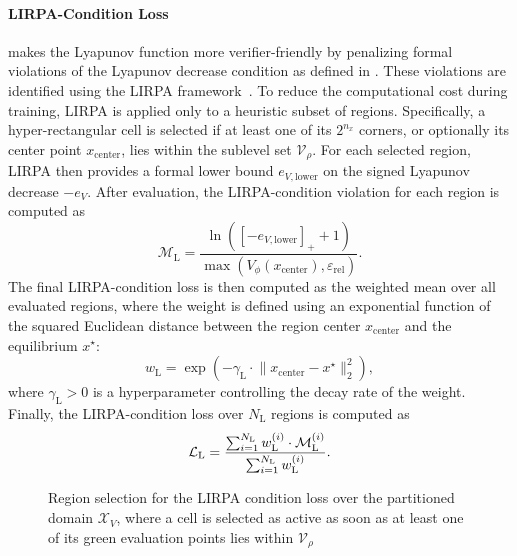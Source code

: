 \paragraph{LIRPA-Condition Loss} makes the Lyapunov function more verifier-friendly 
by penalizing formal violations of the Lyapunov decrease condition as defined in . 
These violations are identified using the LIRPA framework~\cite{xuFastCompleteEnabling2021}.
To reduce the computational cost during training, LIRPA is applied only to a 
heuristic subset of regions. Specifically, a hyper-rectangular cell is selected 
if at least one of its $2^{n_x}$ corners, or optionally its center point $x_{\mathrm{center}}$, 
lies within the sublevel set $\mathcal{V}_\rho$.
For each selected region, LIRPA then provides a formal lower bound $e_{V,\mathrm{lower}}$ on the 
signed Lyapunov decrease $-e_V$. 
After evaluation, the LIRPA-condition violation for each region is computed as
\begin{equation}
    \label{eq:relative-lirpa-condition}
    \mathcal{M}_{\mathrm{L}} = \frac{
        \ln ([-e_{V,\mathrm{lower}}]_+ + 1)
    }{
        \max(V_\phi(x_{\mathrm{center}}), \varepsilon_{\mathrm{rel}})
    }.
\end{equation}
The final LIRPA-condition loss is then computed as the weighted mean over all evaluated regions, 
where the weight is defined using an exponential function of the squared Euclidean distance between 
the region center $x_{\mathrm{center}}$ and the equilibrium $x^\star$:
\begin{equation}
    \label{eq:lirpa-weight}
    w_{\mathrm{L}} = \exp \left(
        - \gamma_{\mathrm{L}} \cdot \lVert x_{\mathrm{center}} - x^\star \rVert^2_2
    \right),
\end{equation}
where $\gamma_{\mathrm{L}} > 0$ is a hyperparameter controlling the decay rate of the weight.
Finally, the LIRPA-condition loss over $N_{\mathrm{L}}$ regions is computed as
\begin{equation}
    \label{eq:relative-lirpa-condition-loss}
    \mathcal{L}_{\mathrm{L}} = \frac{
        \sum_{i=1}^{N_{\mathrm{L}}} w_{\mathrm{L}}^{(i)} \cdot \mathcal{M}_{\mathrm{L}}^{(i)}
    }{
        \sum_{i=1}^{N_{\mathrm{L}}} w_{\mathrm{L}}^{(i)}
    }.
\end{equation}
\begin{figure}[htbp]
    \centering
    
    \caption[LIRPA region selection]{
        Region selection for the LIRPA condition loss over the partitioned domain $\mathcal{X}_V$, 
        where a cell is selected as active as soon as at least one of its green evaluation points lies within $\mathcal{V}_\rho$}
    \label{fig:lirpa-regions}
\end{figure}


